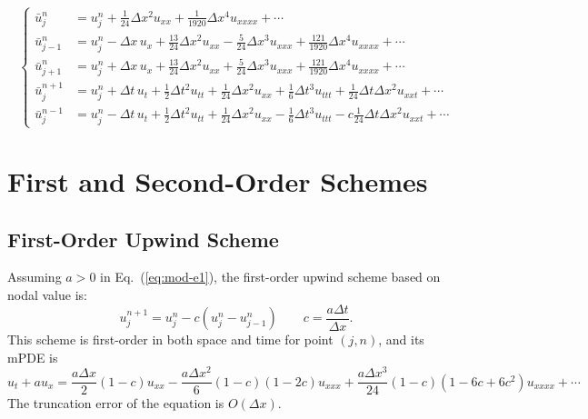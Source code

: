 \documentclass[]{article}
\begin{document}
\begin{equation}
\begin{cases}
\displaystyle
\bar u_{j}^{n} &\displaystyle =  u_j^n + \frac{1}{24}\Delta x^2 u_{xx} + 
\frac{1}{1920} \Delta x^4 u_{xxxx} +\cdots\\[3mm]
\displaystyle
\bar u_{j-1}^n  &\displaystyle = u_j^n - \Delta x\, u_x + \frac{13}{24} \Delta x^2 u_{xx} -\frac{5}{24}\Delta x^3 u_{xxx}  +\frac{121}{1920}\Delta x^4 u_{xxxx}+\cdots \\[3mm]
\displaystyle
\bar u_{j+1}^n  & \displaystyle = u_j^n + \Delta x\, u_x + \frac{13}{24} \Delta x^2 u_{xx} +\frac{5}{24}\Delta x^3 u_{xxx}  +\frac{121}{1920}\Delta x^4 u_{xxxx}+\cdots \\[3mm]
\displaystyle
\bar u_{j}^{n+1}& \displaystyle = u_j^n+\Delta t\, u_t + \frac{1}{2}\Delta t^2 u_{tt} + \frac{1}{24} \Delta x^2 u_{xx} + \frac{1}{6}\Delta t^3 u_{ttt} + \frac{1}{24}\Delta t\Delta x^2 u_{xxt} + \cdots   \\[3mm]
\displaystyle
\bar u_{j}^{n-1}& \displaystyle = u_j^n-\Delta t\, u_t + \frac{1}{2}\Delta t^2 u_{tt} + \frac{1}{24} \Delta x^2 u_{xx} - \frac{1}{6}\Delta t^3 u_{ttt} -c \frac{1}{24}\Delta t\Delta x^2 u_{xxt} + \cdots
\end{cases}
\label{eq:ubar_taylor_many}
\end{equation}




\section{First and Second-Order Schemes}\label{sec:first-second-order}

\subsection{First-Order Upwind Scheme} \label{sec:first-order-upwind}

Assuming $a>0$ in Eq.~(\ref{eq:mod-e1}), the first-order upwind
scheme based on nodal value is:
\begin{equation}
u_j^{n+1} =u_j^n-c(u_j^n-u_{j-1}^n) \qquad 
c=\frac{a\Delta t}{\Delta x}.
\label{eq:up1}
\end{equation}
This scheme is first-order in both space and time for point $(j,n)$,
and its mPDE is
\begin{equation}
u_t+au_x = \frac{a\Delta x}{2}(1-c)u_{xx} - 
\frac{a\Delta x^2}{6}(1-c)(1-2c)u_{xxx} +
\frac{a\Delta x^3}{24}(1-c)(1-6c+6c^2)u_{xxxx}+\cdots
\label{eq:upwind_modified_equ}
\end{equation}
The truncation error of the equation is $O(\Delta x)$.
\end{document}
